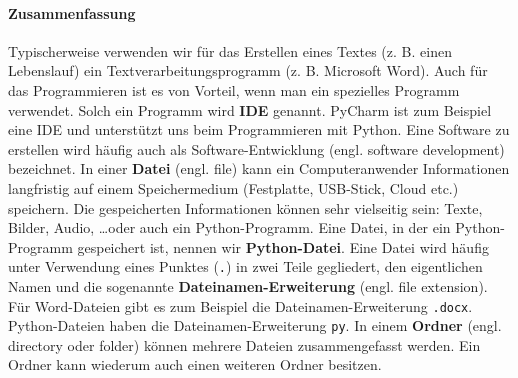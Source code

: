 \paragraph{Zusammenfassung} Typischerweise verwenden wir für das Erstellen eines Textes (z. B. einen Lebenslauf) ein Textverarbeitungsprogramm (z. B. Microsoft Word). Auch für das Programmieren ist es von Vorteil, wenn man ein spezielles Programm verwendet. Solch ein Programm wird \textbf{\ac{IDE}} genannt. PyCharm ist zum Beispiel eine IDE und unterstützt uns beim Programmieren mit Python. Eine Software zu erstellen wird häufig auch als Software-Entwicklung (engl. software development) bezeichnet. In einer \textbf{Datei} (engl. file) kann ein Computeranwender Informationen langfristig auf einem Speichermedium (Festplatte, USB-Stick, Cloud etc.) speichern. Die gespeicherten Informationen können sehr vielseitig sein: Texte, Bilder, Audio, \dots oder auch ein Python-Programm. Eine Datei, in der ein Python-Programm gespeichert ist, nennen wir \textbf{Python-Datei}. Eine Datei wird häufig unter Verwendung eines Punktes (\texttt{.}) in zwei Teile gegliedert, den eigentlichen Namen und die sogenannte \textbf{Dateinamen-Erweiterung} (engl. file extension). Für Word-Dateien gibt es zum Beispiel die Dateinamen-Erweiterung \texttt{.docx}. Python-Dateien haben die Dateinamen-Erweiterung \texttt{py}. In einem \textbf{Ordner} (engl. directory oder folder) können mehrere Dateien zusammengefasst werden. Ein Ordner kann wiederum auch einen weiteren Ordner besitzen.